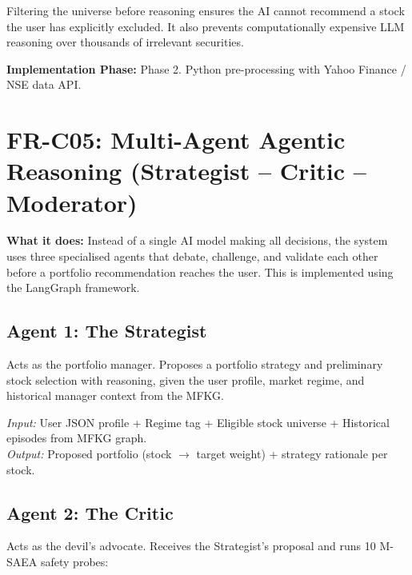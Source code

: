 \documentclass[12pt, a4paper, openany, oneside]{report}
\begin{document}
\begin{valuebox}
Filtering the universe before reasoning ensures the AI cannot recommend a stock the user has explicitly excluded. It also prevents computationally expensive LLM reasoning over thousands of irrelevant securities.
\end{valuebox}

\textbf{Implementation Phase:} Phase 2. Python pre-processing with Yahoo Finance / NSE data API.

\section{FR-C05: Multi-Agent Agentic Reasoning (Strategist -- Critic -- Moderator)}

\textbf{What it does:} Instead of a single AI model making all decisions, the system uses three specialised agents that debate, challenge, and validate each other before a portfolio recommendation reaches the user. This is implemented using the LangGraph framework.

\subsection*{Agent 1: The Strategist}
Acts as the portfolio manager. Proposes a portfolio strategy and preliminary stock selection with reasoning, given the user profile, market regime, and historical manager context from the MFKG.

\textit{Input:} User JSON profile + Regime tag + Eligible stock universe + Historical episodes from MFKG graph.\\
\textit{Output:} Proposed portfolio (stock $\rightarrow$ target weight) + strategy rationale per stock.

\subsection*{Agent 2: The Critic}
Acts as the devil's advocate. Receives the Strategist's proposal and runs 10 M-SAEA safety probes:
\end{document}
